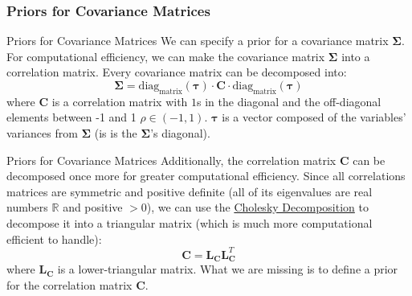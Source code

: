 \subsubsection{Priors for Covariance Matrices}
\begin{frame}{Priors for Covariance Matrices}
	We can specify a prior for a covariance matrix
	$\boldsymbol{\Sigma}$.
	\vfill
	For computational efficiency,
	we can make the covariance matrix $\boldsymbol{\Sigma}$ into a correlation matrix.
	Every covariance matrix can be decomposed into:
	$$
		\boldsymbol{\Sigma}=\text{diag}_\text{matrix}(\boldsymbol{\tau}) \cdot \mathbf{C} \cdot \text{diag}_\text{matrix}(\boldsymbol{\tau})
	$$
	where $\mathbf{C}$ is a correlation matrix with
	$1$s in the diagonal and the off-diagonal elements between -1 and 1 $\rho \in (-1, 1)$.
	$\boldsymbol{\tau}$ is a vector composed of the variables' variances from
	$\boldsymbol{\Sigma}$ (is is the $\boldsymbol{\Sigma}$'s diagonal).
\end{frame}

\begin{frame}{Priors for Covariance Matrices}
	\small
	Additionally, the correlation matrix $\mathbf{C}$
	can be decomposed once more for greater computational efficiency.
	Since all correlations matrices are symmetric and positive definite
	(all of its eigenvalues are real numbers $\mathbb{R}$ and positive $>0$),
	we can use the \href{https://en.wikipedia.org/wiki/Cholesky_decomposition}
	{Cholesky Decomposition}
	to decompose it into a triangular matrix
	(which is much more computational efficient to handle):
	$$
		\mathbf{C} = \mathbf{L}_{\mathbf{C}} \mathbf{L}^T_{\mathbf{C}}
	$$
	where $\mathbf{L}_{\mathbf{C}}$ is a lower-triangular matrix.
	\vfill
	What we are missing is to define a prior for the correlation matrix $\mathbf{C}$.
\end{frame}
